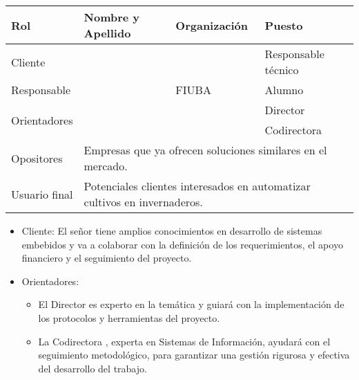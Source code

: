 \begin{table}[ht]
	\begin{tabularx}{\linewidth}{|p{2.15cm}|p{5.8cm}|p{2.85cm}|p{3.4cm}|}
		\hline
		\rowcolor[HTML]{C0C0C0}
		Rol                           & Nombre y Apellido                                                                              & Organización    & Puesto              \\ \hline
		Cliente                       & \clientename                                                                                   & \empclientename & Responsable técnico \\ \hline
		Responsable                   & \authorname                                                                                    & FIUBA           & Alumno              \\ \hline
		\multirow{2}{*}{Orientadores} & \supname                                                                                       & \pertesupname   & Director            \\
		                              & \cosupname                                                                                     & \pertecosupname & Codirectora         \\ \hline
		Opositores                    & \multicolumn{3}{l|}{Empresas que ya ofrecen soluciones similares en el mercado.}                                                       \\ \hline
		Usuario final                 & \multicolumn{3}{l|}{Potenciales clientes interesados en automatizar cultivos en invernaderos.}                                         \\ \hline
	\end{tabularx}
\end{table}

\begin{itemize}
	\item Cliente: El señor \clientename\hspace{1px} tiene amplios conocimientos en
	      desarrollo de sistemas embebidos y va a colaborar con la definición de los
	      requerimientos, el apoyo financiero y el seguimiento del proyecto.
	\item Orientadores:
	      \begin{itemize}
		      \item El Director \supname\hspace{1px} es experto en la temática y guiará con la
		            implementación de los protocolos y herramientas del proyecto.
		      \item La Codirectora \cosupname , experta en Sistemas de Información, ayudará con el
		            seguimiento metodológico, para garantizar una gestión rigurosa y efectiva del
		            desarrollo del trabajo.
	      \end{itemize}
\end{itemize}